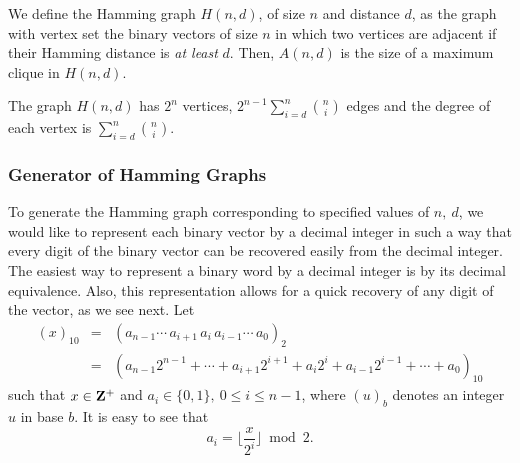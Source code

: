 We define the Hamming graph $H(n,d)$, of size $n$ and distance $d$, as
the graph with vertex set the binary vectors of size $n$ in which two
vertices are adjacent if their Hamming distance is {\em at least} $d$.
Then, $A(n,d)$ is the size of a maximum clique in $H(n,d)$.

The graph $H(n,d)$ has $2^n$ vertices,
$2^{n-1}\sum_{i=d}^{n} {n \choose i}$ edges and the degree of each vertex is
$\sum_{i=d}^{n} {n \choose i}$.

\subsubsection{Generator of Hamming Graphs}
\label{sss:hamm}
To generate the Hamming graph corresponding to specified values of $n,\ d$, we
would like to represent each binary vector by a decimal integer in such a way
that every digit of the binary vector can be recovered easily from the decimal
integer. The easiest way to represent a binary word by a decimal integer is
by its decimal equivalence. Also, this representation allows for a quick
recovery of any digit of the vector, as we see next. Let
\begin{eqnarray}
   (x)_{10} & = & (a_{n-1} \cdots\, a_{i+1}\, a_i\, a_{i-1} \cdots\,
                  a_0)_2                         \label{eq:comp1} \\ 
            & = & (a_{n-1}2^{n-1}+ \cdots
                  +a_{i+1}2^{i+1}+a_i2^i+ a_{i-1}2^{i-1}+ 
                  \cdots +a_0)_{10}              \nonumber       
\end{eqnarray}
such that $x \in {\bf Z}^{+}$ and $a_i \in \{0,1\},\ 0 \leq i \leq
n-1$, where $(u)_{b}$ denotes an integer $u$ in base $b$. It is easy to see that
\begin{displaymath}
a_{i}= \lfloor \frac{x}{2^{i}} \rfloor \bmod 2.
\end{displaymath}


